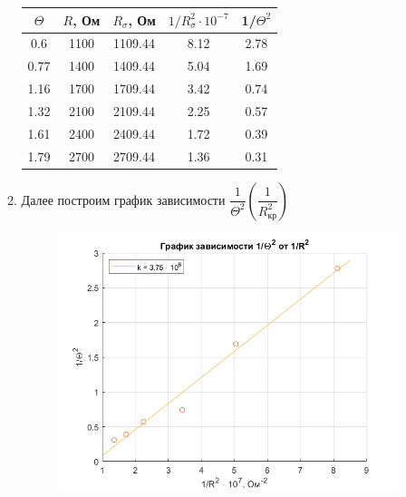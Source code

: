 \documentclass[a4paper,12pt]{article}
\begin{document}
\begin{enumerate}
\begin{enumerate}
\begin{center}
\begin{tabular}{|c|c|c|c|c|}
\hline 
$\Theta$ & $R$, Ом & $R_{\sigma}$, Ом & $1/R_{\sigma}^{2} \cdot 10^{-7}$ & 1/$\Theta^2$ \\ 
\hline 
0.6 & 1100 & 1109.44 &  8.12 &  2.78  \\ 
\hline 
0.77 & 1400 & 1409.44 & 5.04 & 1.69 \\ 
\hline 
1.16 & 1700 & 1709.44 & 3.42 & 0.74 \\ 
\hline 
1.32 & 2100 & 2109.44 & 2.25 & 0.57 \\ 
\hline 
1.61 & 2400 & 2409.44 & 1.72 & 0.39 \\ 
\hline 
1.79 & 2700 & 2709.44 & 1.36 & 0.31 \\ 
\hline 
\end{tabular} 
\end{center}

\item Далее построим график зависимости $\dfrac{1}{\Theta^2}(\dfrac{1}{R^2_\text{кр}})$ 
\begin{figure}
\begin{center}
\includegraphics[scale=0.6]{graph2.png}
\end{center}
\end{figure}


\end{enumerate}
\end{enumerate}
\end{document}
